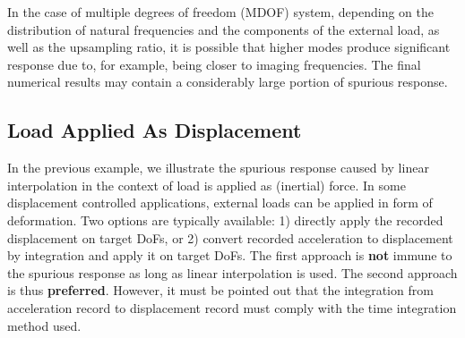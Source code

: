 In the case of multiple degrees of freedom (MDOF) system, depending on the distribution of natural frequencies and the components of the external load, as well as the upsampling ratio, it is possible that higher modes produce significant response due to, for example, being closer to imaging frequencies. The final numerical results may contain a considerably large portion of spurious response.
\subsection{Load Applied As Displacement}
In the previous example, we illustrate the spurious response caused by linear interpolation in the context of load is applied as (inertial) force. In some displacement controlled applications, external loads can be applied in form of deformation. Two options are typically available: 1) directly apply the recorded displacement on target DoFs, or 2) convert recorded acceleration to displacement by integration and apply it on target DoFs. The first approach is \textbf{not} immune to the spurious response as long as linear interpolation is used. The second approach is thus \textbf{preferred}. However, it must be pointed out that the integration from acceleration record to displacement record must comply with the time integration method used.

